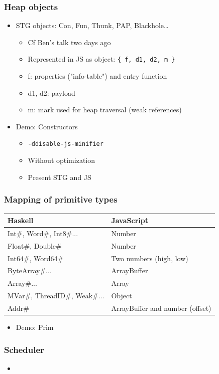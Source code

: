 \documentclass{beamer}
\begin{document}
\begin{frame}
\frametitle{Heap objects}
  \begin{itemize}
    \item STG objects: Con, Fun, Thunk, PAP, Blackhole…
      \begin{itemize}
        \item Cf Ben's talk two days ago
        \item Represented in JS as object: \texttt{\{ f, d1, d2, m \}}
        \item f: properties ("info-table") and entry
          function
        \item d1, d2: payload
        \item m: mark used for heap traversal (weak references)
      \end{itemize}
    \item Demo: Constructors
      \begin{itemize}
        \item \texttt{-ddisable-js-minifier}
        \item Without optimization
        \item Present STG and JS
      \end{itemize}
  \end{itemize}
\end{frame}


\begin{frame}
  \frametitle{Mapping of primitive types}
  \begin{tabular}{ll}
    \hline
    Haskell & JavaScript \\ \hline
    Int\#, Word\#, Int8\#... & Number \\
    Float\#, Double\#        & Number\\
    Int64\#, Word64\#        & Two numbers (high, low) \\
    ByteArray\#...           & ArrayBuffer\\
    Array\#...               & Array\\
    MVar\#, ThreadID\#, Weak\#... & Object\\
    Addr\#                   & \alert{ArrayBuffer and number (offset)}\\
  \end{tabular}
  \hspace{1cm}
  \begin{itemize}
    \item Demo: Prim
  \end{itemize}
\end{frame}


\begin{frame}
\frametitle{Scheduler}
  \begin{itemize}
    \item 
  \end{itemize}
\end{frame}
\end{document}
